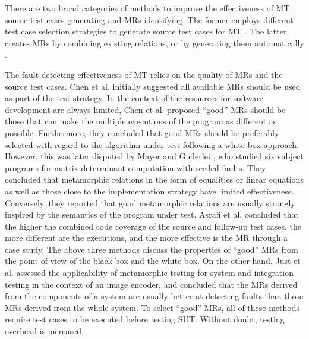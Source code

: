 \documentclass[10pt,journal,compsoc]{IEEEtran}
\begin{document}
There are two broad categories of methods to improve the effectiveness of MT: source test cases generating and MRs identifying. The former employs different test case selection strategies to generate source test cases for MT \cite{chen2004metamorphic, barus2016impact}. The latter creates MRs by combining existing relations, or by generating them automatically \cite{chen2004case, cao2013correlation, sun2011metamorphic, chen2016metric, xie2016looking}.

The fault-detecting effectiveness of MT relies on the quality of MRs and the source test cases. 
Chen et al. \cite{chen2004metamorphic} initially suggested all available MRs should be used as part of the test strategy. In the context of the resources for software development are always limited, 
Chen et al. \cite{chen2004case} proposed ``good'' MRs should be those that can make the multiple executions of the program as different as possible. Furthermore, they concluded that good MRs should be preferably selected with regard to the algorithm
under test following a white-box approach. 
However, this was later disputed by Mayer and Guderlei \cite{mayer2006empirical}, who studied six subject programs for matrix determinant computation with seeded faults. They concluded that metamorphic relations in the form of equalities or linear equations as well as those close to the implementation strategy have limited effectiveness. Conversely, they reported that good metamorphic relations are usually strongly inspired by the semantics of the program under test.
Asrafi et al. \cite{asrafi2011testing} concluded that the higher the combined code coverage of the source and follow-up test cases, the more different are the executions, and the more effective is the MR through a case study. 
The above three methods discuss the properties of ``good'' MRs from the point of view of the black-box and the white-box.
On the other hand, Just et al. \cite{Just2010Automating} assessed the applicability of metamorphic testing for system and integration testing in the context of an image encoder, and concluded that the MRs derived from the components of a system are usually better at detecting faults than those MRs derived from the whole system. To select ``good'' MRs, all of these methods require test cases to be executed before testing SUT. Without doubt, testing overhead is increased.
\end{document}
